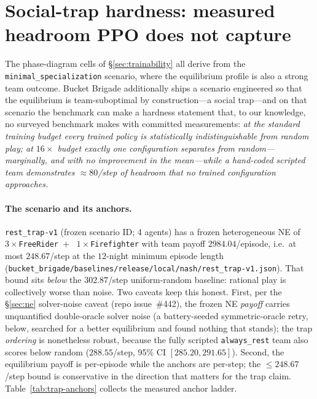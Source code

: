 \documentclass{anvil-paper}
\begin{document}
\section{Social-trap hardness: measured headroom PPO does not capture}
\label{sec:resttrap}

The phase-diagram cells of \S\ref{sec:trainability} all derive from the
\texttt{minimal\_specialization} scenario, where the equilibrium profile
is also a strong team outcome. Bucket Brigade additionally ships a
scenario engineered so that the equilibrium is team-suboptimal by
construction---a social trap---and on that scenario the benchmark can
make a hardness statement that, to our knowledge, no surveyed benchmark
makes with committed measurements: \emph{at the standard training
budget every trained policy is statistically indistinguishable from
random play; at $16{\times}$ budget exactly one configuration separates
from random---marginally, and with no improvement in the mean---while a
hand-coded scripted team demonstrates ${\approx}80$/step of headroom
that no trained configuration approaches.}

\paragraph{The scenario and its anchors.}
\texttt{rest\_trap-v1} (frozen scenario ID; 4 agents) has a frozen
heterogeneous NE of $3{\times}$\texttt{FreeRider}~$+$~%
$1{\times}$\texttt{Firefighter} with team payoff $2984.04$/episode,
i.e.\ at most $248.67$/step at the $12$-night minimum episode length
(\texttt{bucket\_brigade/baselines/release/local/nash/rest\_trap-v1.json}).
That bound sits \emph{below} the $302.87$/step uniform-random baseline:
rational play is collectively worse than noise. Two caveats keep this
honest. First, per the \S\ref{sec:ne} solver-noise caveat (repo
issue~\#442), the frozen NE \emph{payoff} carries unquantified
double-oracle solver noise (a battery-seeded symmetric-oracle retry,
below, searched for a better equilibrium and found nothing that
stands); the trap \emph{ordering} is nonetheless robust, because the
fully scripted \texttt{always\_rest} team also scores below random
($288.55$/step, 95\% CI $[285.20, 291.65]$). Second, the equilibrium
payoff is per-episode while the anchors are per-step; the
$\leq 248.67$/step bound is conservative in the direction that matters
for the trap claim. Table~\ref{tab:trap-anchors} collects the measured
anchor ladder.
\end{document}
